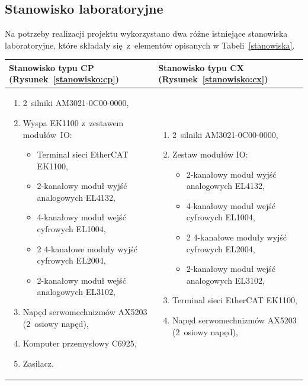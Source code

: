 \subsection{Stanowisko laboratoryjne}
Na potrzeby realizacji projektu wykorzystano dwa różne istniejące stanowiska laboratoryjne, które składały się~z~elementów opisanych w Tabeli~\ref{stanowiska}.
\begin{table}[!htb]
\begin{center}
\begin{tabular}{| p{} || p{} |}\hline
Stanowisko typu CP (Rysunek~\ref{stanowisko:cp}) & Stanowisko typu CX (Rysunek~\ref{stanowisko:cx})  \\\hline
\begin{enumerate}
\item 2~silniki AM3021-0C00-0000,
\item Wyspa EK1100 z~zestawem modułów~IO:
\begin{itemize}
\item Terminal sieci EtherCAT EK1100,
\item 2-kanałowy moduł wyjść analogowych EL4132,
\item 4-kanałowy moduł wejść cyfrowych EL1004,
\item 2 4-kanałowe moduły wyjść cyfrowych EL2004,
\item 2-kanałowy moduł wejść analogowych EL3102,
\end{itemize}
\item Napęd serwomechnizmów AX5203 (2~osiowy napęd),
\item Komputer przemysłowy C6925,
\item Zasilacz.
\end{enumerate}
&
\begin{enumerate}
\item 2~silniki AM3021-0C00-0000,
\item Zestaw modułów IO:
\begin{itemize}
\item 2-kanałowy moduł wyjść analogowych EL4132,
\item 4-kanałowy moduł wejść cyfrowych EL1004,
\item 2 4-kanałowe moduły wyjść cyfrowych EL2004,
\item 2-kanałowy moduł wejść analogowych EL3102,
\end{itemize}
\item Terminal sieci EtherCAT EK1100,
\item Napęd serwomechnizmów AX5203 (2~osiowy napęd),

\end{enumerate}
\end{tabular}
\end{center}
\end{table}
